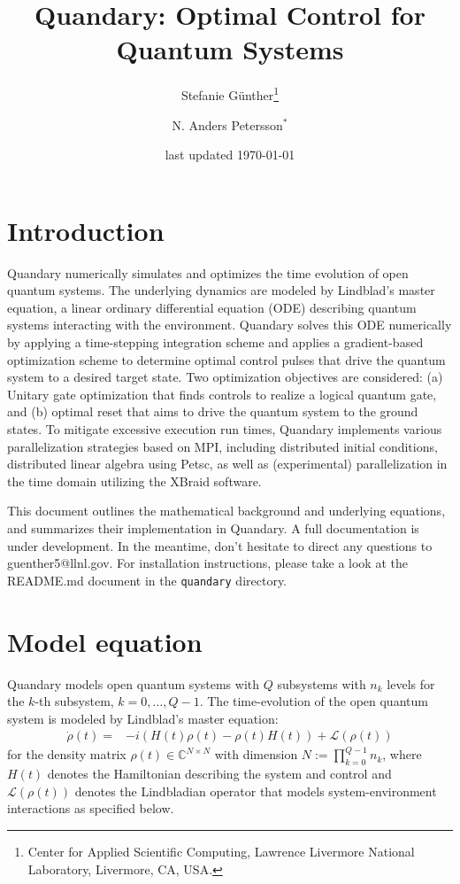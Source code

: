 \documentclass[11pt]{article}
\title{Quandary: Optimal Control for Quantum Systems}
\author{Stefanie G{\"u}nther\thanks{Center for Applied Scientific Computing, Lawrence Livermore
    National Laboratory, Livermore, CA, USA.} \and N. Anders Petersson$^*$}
\date{last updated \today}
\newcommand{\Ell}{\mathcal{L}}
\newcommand{\C}{\mathds{C}}
\begin{document}
\maketitle


\section{Introduction}
Quandary numerically simulates and optimizes the time evolution of open quantum systems. The
underlying dynamics are modeled by Lindblad's master equation, a linear ordinary differential
equation (ODE) describing quantum systems interacting with the environment. Quandary solves this ODE
numerically by applying a time-stepping integration scheme and applies a gradient-based optimization
scheme to determine optimal control pulses that drive the quantum system to a desired target state.
Two optimization objectives are considered: (a) Unitary gate optimization that finds controls to
realize a logical quantum gate, and (b) optimal reset that aims to drive the quantum system to the
ground states.
To mitigate excessive execution run times, Quandary implements various parallelization strategies based on MPI, including distributed initial conditions, distributed linear algebra using Petsc, as well as (experimental) parallelization in the time domain utilizing the XBraid software.

This document outlines the mathematical background and underlying equations, and summarizes their
implementation in Quandary. A full documentation is under development. In the meantime, don't
hesitate to direct any questions to guenther5@llnl.gov. For installation instructions, please take a
look at the README.md document in the \verb+quandary+ directory.

\section{Model equation}
Quandary models open quantum systems with $Q$ subsystems with $n_k$ levels for the
$k$-th subsystem, $k=0,\dots,Q-1$. The time-evolution of the open quantum system is modeled by Lindblad's master equation:
\begin{align}\label{mastereq}
  \dot \rho(t) = &-i(H(t)\rho(t) - \rho(t)H(t)) + \Ell(\rho(t))
\end{align}
for the density matrix $\rho(t)\in \C^{N\times N}$ with dimension $N :=
\prod_{k=0}^{Q-1} n_k$, where $H(t)$ denotes the Hamiltonian describing the system and control and $\Ell(\rho(t))$ denotes the Lindbladian operator that models system-environment interactions as specified below.
\end{document}
